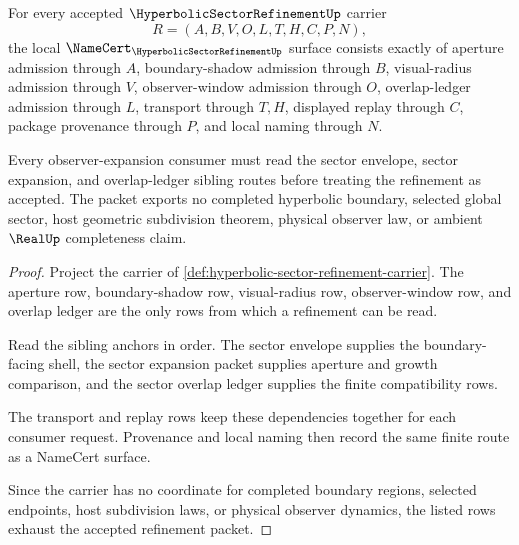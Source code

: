 \begin{theorem}
\label{thm:hyperbolic-sector-refinement-namecert-obligations}
For every accepted $\HyperbolicSectorRefinementUp$ carrier
$$
R=(A,B,V,O,L,T,H,C,P,N),
$$
the local $\NameCert_{\HyperbolicSectorRefinementUp}$ surface consists exactly of aperture admission through $A$, boundary-shadow admission through $B$, visual-radius admission through $V$, observer-window admission through $O$, overlap-ledger admission through $L$, transport through $T,H$, displayed replay through $C$, package provenance through $P$, and local naming through $N$.

Every observer-expansion consumer must read the sector envelope, sector expansion, and overlap-ledger sibling routes before treating the refinement as accepted. The packet exports no completed hyperbolic boundary, selected global sector, host geometric subdivision theorem, physical observer law, or ambient $\RealUp$ completeness claim.
\end{theorem}
\begin{proof}
Project the carrier of \autoref{def:hyperbolic-sector-refinement-carrier}. The aperture row, boundary-shadow row, visual-radius row, observer-window row, and overlap ledger are the only rows from which a refinement can be read.

Read the sibling anchors in order. The sector envelope supplies the boundary-facing shell, the sector expansion packet supplies aperture and growth comparison, and the sector overlap ledger supplies the finite compatibility rows.

The transport and replay rows keep these dependencies together for each consumer request. Provenance and local naming then record the same finite route as a NameCert surface.

Since the carrier has no coordinate for completed boundary regions, selected endpoints, host subdivision laws, or physical observer dynamics, the listed rows exhaust the accepted refinement packet.
\end{proof}



